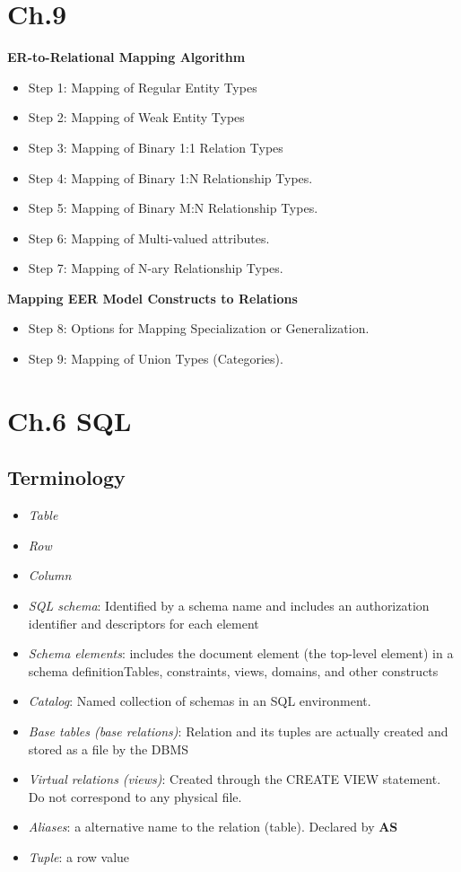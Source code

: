 \documentclass{article}
\begin{document}
\section{Ch.9}
\textbf{ER-to-Relational Mapping Algorithm}
\begin{itemize}
    \item Step 1: Mapping of Regular Entity Types
    \item Step 2: Mapping of Weak Entity Types
    \item Step 3: Mapping of Binary 1:1 Relation Types
    \item Step 4: Mapping of Binary 1:N Relationship Types.
    \item Step 5: Mapping of Binary M:N Relationship Types.
    \item Step 6: Mapping of Multi-valued attributes.
    \item Step 7: Mapping of N-ary Relationship Types.
\end{itemize}

\noindent\textbf{Mapping EER Model Constructs to Relations}
\begin{itemize}
    \item Step 8: Options for Mapping Specialization or Generalization.
    \item Step 9: Mapping of Union Types (Categories).
\end{itemize}

\newpage
\section{Ch.6 SQL}
\subsection{Terminology}
\begin{itemize}
    \item \textit{Table}
    \item \textit{Row}
    \item \textit{Column}
    \item \textit{SQL schema}: Identified by a schema name and includes an authorization identifier and descriptors
for each element
    \item \textit{Schema elements}: includes the document element (the top-level element) in a schema definitionTables, constraints, views, domains, and other 
constructs
    \item \textit{Catalog}: Named collection of schemas in an SQL environment.
    \item \textit{Base tables (base relations)}: Relation and its tuples are actually created and 
        stored as a file by the DBMS
    \item \textit{Virtual relations (views)}: Created through the CREATE VIEW statement. 
        Do not correspond to any physical file.
    \item \textit{Aliases}: a alternative name to the relation (table). Declared by \textbf{AS}
    \item \textit{Tuple}: a row value
\end{itemize} 
\end{document}

